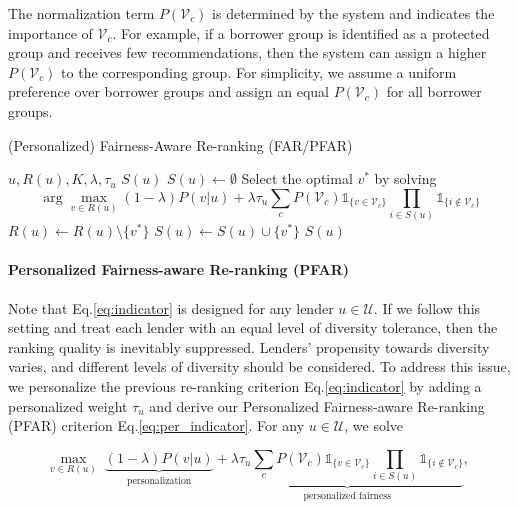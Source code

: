 The normalization term $P(\mathcal V_c)$ is determined by the system and indicates the importance of $\mathcal V_c$. For example, if a borrower group is identified as a protected group and receives few recommendations, then the system can assign a higher $P(\mathcal V_c)$ to the corresponding group. For simplicity, we assume a uniform preference over borrower groups and assign an equal $P(\mathcal V_c)$ for all borrower groups.



\begin{algorithm}[t]
\caption{(Personalized) Fairness-Aware Re-ranking (FAR/PFAR)}
\begin{algorithmic}[1]
\REQUIRE $u,R(u),K,\lambda, \tau_u$
\ENSURE $S(u)$
\STATE $S(u)\leftarrow\emptyset$
\STATE Select the optimal $v^*$ by solving $$\arg\max_{v\in R(u)}(1-\lambda)P(v|u)+\lambda\tau_u \sum_{c}P(\mathcal V_c)\mathds{1}_{\{v\in \mathcal V_c\}}\prod_{i\in S(u)}\mathds{1}_{\{i\notin \mathcal V_c\}}$$
\STATE $R(u)\leftarrow R(u)\setminus \{v^*\}$
\STATE $S(u)\leftarrow S(u)\cup\{v^*\}$
\ENDWHILE
\RETURN $S(u)$
\end{algorithmic}
\label{alg:main}
\end{algorithm}


\paragraph{\textbf{Personalized Fairness-aware Re-ranking (PFAR)}}

Note that Eq.\eqref{eq:indicator} is designed for any lender $u\in \mathcal U$. If we follow this setting and treat each lender with an equal level of diversity tolerance, then the ranking quality is inevitably suppressed. Lenders' propensity towards diversity varies, and different levels of diversity should be considered. To address this issue, we personalize the previous re-ranking criterion Eq.\eqref{eq:indicator} by adding a personalized weight $\tau_u$ and derive our Personalized Fairness-aware Re-ranking (PFAR) criterion Eq.\eqref{eq:per_indicator}. 
For any $u\in \mathcal U$, we solve

\begin{equation}
\max_{v\in R(u)}\;\underbrace{(1-\lambda)P(v|u)}_{\text{personalization}} + \underbrace{\lambda\tau_u\sum_{c}P(\mathcal V_c)\mathds{1}_{\{v\in \mathcal V_c\}}\prod_{i\in S(u)}\mathds{1}_{\{i\notin \mathcal V_c\}}}_{\text{personalized fairness}},\; %
\label{eq:per_indicator}
\end{equation}
\vspace{0.25cm}

